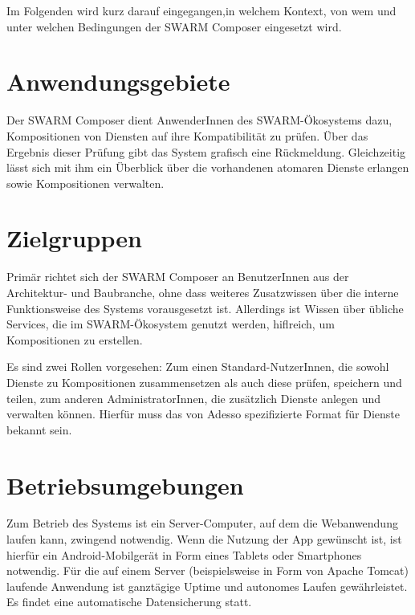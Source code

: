 Im Folgenden wird kurz darauf eingegangen,in welchem Kontext, von wem und unter welchen Bedingungen der SWARM Composer eingesetzt wird.

\section*{Anwendungsgebiete}
Der SWARM Composer dient AnwenderInnen des SWARM-Ökosystems dazu, Kompositionen von Diensten auf ihre Kompatibilität zu prüfen. Über das Ergebnis dieser Prüfung gibt das System grafisch eine Rückmeldung. Gleichzeitig lässt sich mit ihm ein Überblick über die vorhandenen atomaren Dienste erlangen sowie Kompositionen verwalten. 

\section*{Zielgruppen}

Primär richtet sich der SWARM Composer an BenutzerInnen aus der Architektur- und Baubranche, ohne dass weiteres Zusatzwissen über die interne Funktionsweise des Systems vorausgesetzt ist. Allerdings ist Wissen über übliche Services, die im SWARM-Ökosystem genutzt werden, hiflreich, um Kompositionen zu erstellen.

Es sind zwei Rollen vorgesehen: Zum einen Standard-NutzerInnen, die sowohl Dienste zu Kompositionen zusammensetzen als auch diese prüfen, speichern und teilen, zum anderen AdministratorInnen, die zusätzlich Dienste anlegen und verwalten können. Hierfür muss das von Adesso spezifizierte Format für Dienste bekannt sein.

\section*{Betriebsumgebungen}

Zum Betrieb des Systems ist ein Server-Computer, auf dem die Webanwendung laufen kann, zwingend notwendig. Wenn die Nutzung der App gewünscht ist, ist hierfür ein Android-Mobilgerät in Form eines Tablets oder Smartphones notwendig. Für die auf einem Server (beispielsweise in Form von Apache Tomcat) laufende Anwendung ist ganztägige Uptime und autonomes Laufen gewährleistet. Es findet eine automatische Datensicherung statt.




